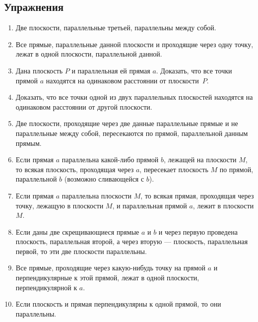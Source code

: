 {\small

\subsection*{Упражнения}


\begin{enumerate}[noitemsep]

\item
Две плоскости, параллельные третьей, параллельны между собой.

\item
Все прямые, параллельные данной плоскости и проходящие через одну точку, лежат в одной плоскости, параллельной данной.

\item Дана плоскость $P$ и параллельная ей прямая $a$.
Доказать, что все точки прямой $a$ находятся на одинаковом расстоянии от плоскости~$P$.

\item
Доказать, что все точки одной из двух параллельных плоскостей находятся на одинаковом расстоянии от другой плоскости.

\item
Две плоскости, проходящие через две данные параллельные прямые и не параллельные между собой, пересекаются по прямой, параллельной данным прямым.

\item
Если прямая $a$ параллельна какой-либо прямой $b$, лежащей на плоскости $M$, то всякая плоскость, проходящая через $a$, пересекает плоскость $M$ по прямой, параллельной $b$ (возможно сливающейся с $b$).

\item
Если прямая $a$ параллельна плоскости $M$, то всякая прямая, проходящая через точку, лежащую в плоскости $M$, и параллельная прямой $a$, лежит в плоскости $M$.

\item
Если даны две скрещивающиеся прямые $a$ и $b$ и через первую проведена плоскость, параллельная второй, а через вторую — плоскость, параллельная первой, то эти две плоскости параллельны.

\item
Все прямые, проходящие через какую-нибудь точку на прямой $a$ и перпендикулярные к этой прямой, лежат в одной плоскости, перпендикулярной к $a$.

\item
Если плоскость и прямая перпендикулярны к одной прямой, то они параллельны.


\end{enumerate}}
